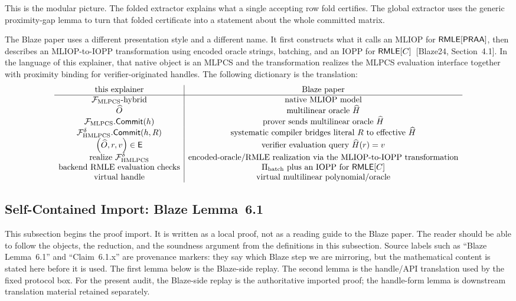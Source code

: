 This is the modular picture.  The folded extractor explains what a single
accepting row fold certifies.  The global extractor uses the generic
proximity-gap lemma to turn that folded certificate into a statement about the
whole committed matrix.

The Blaze paper uses a different presentation style and a different name.  It
first constructs what it calls an MLIOP for \(\mathsf{RMLE}[\mathsf{PRAA}]\), then describes an
MLIOP-to-IOPP transformation using encoded oracle strings, batching, and an
IOPP for \(\mathsf{RMLE}[C]\)~[Blaze24, Section~4.1].  In the language of this
explainer, that native object is an MLPCS and the transformation realizes the
MLPCS evaluation interface together with proximity binding for
verifier-originated handles.  The following dictionary is the translation:
\[
\begin{array}{c|c}
\text{this explainer} & \text{Blaze paper} \\
\hline
\mathcal F_{\mathrm{MLPCS}}\text{-hybrid} &
\text{native MLIOP model} \\
\widehat O &
\text{multilinear oracle } \widehat H \\
\mathcal F_{\mathrm{MLPCS}}.\mathsf{Commit}(h) &
\text{prover sends multilinear oracle }\widehat H \\
\mathcal F_{\mathrm{HMLPCS}}^\delta.\mathsf{Commit}(h,R) &
\text{systematic compiler bridges literal }R\text{ to effective }\widehat H \\
\left(\widehat O,r,v\right)\in\mathsf{E} &
\text{verifier evaluation query } \widehat H(r)=v \\
\text{realize }\mathcal F_{\mathrm{HMLPCS}}^\delta &
\text{encoded-oracle/RMLE realization via the MLIOP-to-IOPP transformation} \\
\text{backend RMLE evaluation checks} &
\Pi_{\mathrm{batch}}\text{ plus an IOPP for }\mathsf{RMLE}[C] \\
\text{virtual handle} &
\text{virtual multilinear polynomial/oracle}
\end{array}
\]

\subsection{Self-Contained Import: Blaze Lemma~6.1}

This subsection begins the proof import.  It is written as a local proof, not
as a reading guide to the Blaze paper.  The reader should be able to follow the
objects, the reduction, and the soundness argument from the definitions in this
subsection.  Source labels such as ``Blaze Lemma~6.1'' and
``Claim~6.1.x'' are provenance markers: they say which Blaze step we are
mirroring, but the mathematical content is stated here before it is used.
The first lemma below is the Blaze-side replay.  The second lemma is the
handle/API translation used by the fixed protocol box.  For the present audit,
the Blaze-side replay is the authoritative imported proof; the handle-form
lemma is downstream translation material retained separately.

